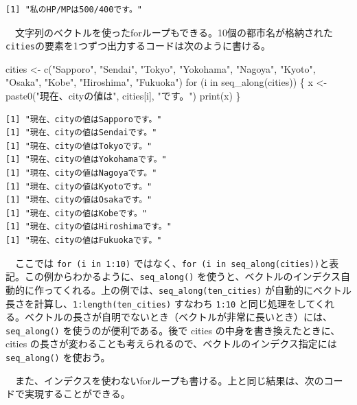 \documentclass[
  a4paper,
  pandoc,
  ja=standard,
  jafont=haranoaji]{bxjsbook}
\newenvironment{Shaded}{\begin{snugshade}}{\end{snugshade}}
\newcommand{\ControlFlowTok}[1]{\textcolor[rgb]{0.00,0.48,0.65}{#1}}
\newcommand{\FunctionTok}[1]{\textcolor[rgb]{0.28,0.35,0.67}{#1}}
\newcommand{\NormalTok}[1]{\textcolor[rgb]{0.00,0.48,0.65}{#1}}
\newcommand{\OtherTok}[1]{\textcolor[rgb]{0.00,0.48,0.65}{#1}}
\newcommand{\StringTok}[1]{\textcolor[rgb]{0.13,0.47,0.30}{#1}}
\begin{document}
\begin{verbatim}
[1] "私のHP/MPは500/400です。"
\end{verbatim}

　文字列のベクトルを使ったforループもできる。10個の都市名が格納された\texttt{cities}の要素を1つずつ出力するコードは次のように書ける。

\begin{Shaded}
\begin{Highlighting}[numbers=left,,]
\NormalTok{cities }\OtherTok{\textless{}{-}} \FunctionTok{c}\NormalTok{(}\StringTok{"Sapporo"}\NormalTok{, }\StringTok{"Sendai"}\NormalTok{, }\StringTok{"Tokyo"}\NormalTok{, }\StringTok{"Yokohama"}\NormalTok{, }\StringTok{"Nagoya"}\NormalTok{,}
            \StringTok{"Kyoto"}\NormalTok{, }\StringTok{"Osaka"}\NormalTok{, }\StringTok{"Kobe"}\NormalTok{, }\StringTok{"Hiroshima"}\NormalTok{, }\StringTok{"Fukuoka"}\NormalTok{)}
\ControlFlowTok{for}\NormalTok{ (i }\ControlFlowTok{in} \FunctionTok{seq\_along}\NormalTok{(cities)) \{}
\NormalTok{  x }\OtherTok{\textless{}{-}} \FunctionTok{paste0}\NormalTok{(}\StringTok{"現在、cityの値は"}\NormalTok{, cities[i], }\StringTok{"です。"}\NormalTok{)}
  \FunctionTok{print}\NormalTok{(x)}
\NormalTok{\}}
\end{Highlighting}
\end{Shaded}

\begin{verbatim}
[1] "現在、cityの値はSapporoです。"
[1] "現在、cityの値はSendaiです。"
[1] "現在、cityの値はTokyoです。"
[1] "現在、cityの値はYokohamaです。"
[1] "現在、cityの値はNagoyaです。"
[1] "現在、cityの値はKyotoです。"
[1] "現在、cityの値はOsakaです。"
[1] "現在、cityの値はKobeです。"
[1] "現在、cityの値はHiroshimaです。"
[1] "現在、cityの値はFukuokaです。"
\end{verbatim}

　ここでは \texttt{for\ (i\ in\ 1:10)}
ではなく、\texttt{for\ (i\ in\ seq\_along(cities))}と表記。この例からわかるように、\texttt{seq\_along()}
を使うと、ベクトルのインデクス自動的に作ってくれる。上の例では、\texttt{seq\_along(ten\_cities)}
が自動的にベクトル長さを計算し、\texttt{1:length(ten\_cities)} すなわち
\texttt{1:10}
と同じ処理をしてくれる。ベクトルの長さが自明でないとき（ベクトルが非常に長いとき）には、\texttt{seq\_along()}
を使うのが便利である。後で cities の中身を書き換えたときに、cities
の長さが変わることも考えられるので、ベクトルのインデクス指定には
\texttt{seq\_along()} を使おう。

　また、インデクスを使わないforループも書ける。上と同じ結果は、次のコードで実現することができる。
\end{document}
